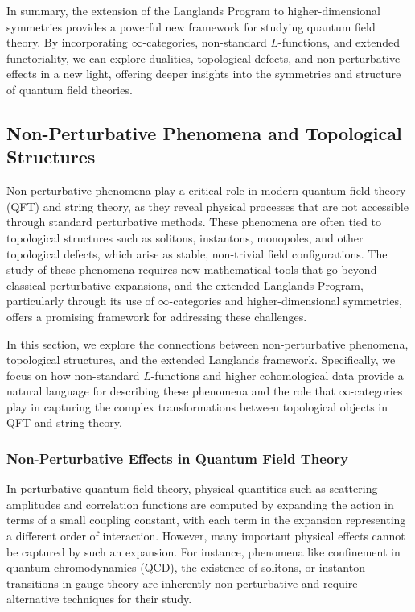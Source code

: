\documentclass{article}
\theoremstyle{remark}
\begin{document}
In summary, the extension of the Langlands Program to higher-dimensional symmetries provides a powerful new framework for studying quantum field theory. By incorporating $\infty$-categories, non-standard $L$-functions, and extended functoriality, we can explore dualities, topological defects, and non-perturbative effects in a new light, offering deeper insights into the symmetries and structure of quantum field theories.

\subsection{Non-Perturbative Phenomena and Topological Structures}

Non-perturbative phenomena play a critical role in modern quantum field theory (QFT) and string theory, as they reveal physical processes that are not accessible through standard perturbative methods. These phenomena are often tied to topological structures such as solitons, instantons, monopoles, and other topological defects, which arise as stable, non-trivial field configurations. The study of these phenomena requires new mathematical tools that go beyond classical perturbative expansions, and the extended Langlands Program, particularly through its use of $\infty$-categories and higher-dimensional symmetries, offers a promising framework for addressing these challenges.

In this section, we explore the connections between non-perturbative phenomena, topological structures, and the extended Langlands framework. Specifically, we focus on how non-standard $L$-functions and higher cohomological data provide a natural language for describing these phenomena and the role that $\infty$-categories play in capturing the complex transformations between topological objects in QFT and string theory.

\subsubsection{Non-Perturbative Effects in Quantum Field Theory}

In perturbative quantum field theory, physical quantities such as scattering amplitudes and correlation functions are computed by expanding the action in terms of a small coupling constant, with each term in the expansion representing a different order of interaction. However, many important physical effects cannot be captured by such an expansion. For instance, phenomena like confinement in quantum chromodynamics (QCD), the existence of solitons, or instanton transitions in gauge theory are inherently non-perturbative and require alternative techniques for their study.
\end{document}
